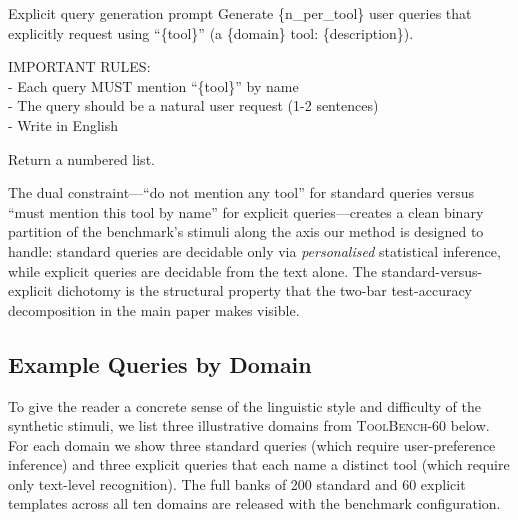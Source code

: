 \begin{promptbox}{Explicit query generation prompt}
Generate \{n\_per\_tool\} user queries that explicitly request using
``\{tool\}'' (a \{domain\} tool: \{description\}).

IMPORTANT RULES:\\
\hspace*{1em}- Each query MUST mention ``\{tool\}'' by name\\
\hspace*{1em}- The query should be a natural user request (1-2 sentences)\\
\hspace*{1em}- Write in English

Return a numbered list.
\end{promptbox}

The dual constraint---``do not mention any tool'' for standard queries
versus ``must mention this tool by name'' for explicit queries---creates
a clean binary partition of the benchmark's stimuli along the axis our
method is designed to handle: standard queries are decidable only via
\emph{personalised} statistical inference, while explicit queries are
decidable from the text alone. The standard-versus-explicit dichotomy
is the structural property that the two-bar test-accuracy decomposition
in the main paper makes visible.


\subsection{Example Queries by Domain}
\label{app:prompts:examples}

To give the reader a concrete sense of the linguistic style and
difficulty of the synthetic stimuli, we list three illustrative
domains from \textsc{ToolBench-60} below. For each domain we show three
standard queries (which require user-preference inference) and three
explicit queries that each name a distinct tool (which require only
text-level recognition). The full banks of 200 standard and 60
explicit templates across all ten domains are released with the
benchmark configuration.

